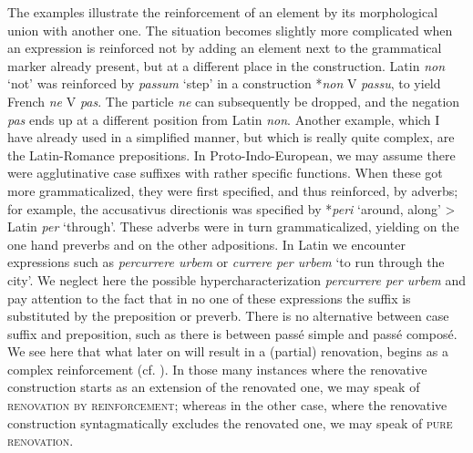 The examples illustrate the reinforcement of an element by its morphological union with another one. The situation becomes slightly more complicated when an expression is reinforced not by adding an element next to the grammatical marker already present, but at a different place in the construction. Latin \textit{non} ‘not’ was reinforced by \textit{passum} ‘step’ in a construction *\textit{non} V \textit{passu}, to yield French \textit{ne} V \textit{pas}. The particle \textit{ne} can subsequently be dropped, and the negation \textit{pas} ends up at a different position from Latin \textit{non}. Another example, which I have already used in a simplified manner, but which is really quite complex, are the Latin-Romance prepositions. In Proto-Indo-European, we may assume there were agglutinative case suffixes with rather specific functions. When these got more grammaticalized, they were first specified, and thus reinforced, by adverbs; for example, the accusativus directionis was specified by *\textit{peri} ‘around, along’ {\textgreater} Latin \textit{per} ‘through’. These adverbs were in turn grammaticalized, yielding on the one hand preverbs and on the other adpositions. In Latin we encounter expressions such as \textit{percurrere urbem} or \textit{currere per urbem} ‘to run through the city’. We neglect here the possible hypercharacterization \textit{percurrere per urbem} and pay attention to the fact that in no one of these expressions the suffix is substituted by the preposition or preverb. There is no alternative between case suffix and preposition, such as there is between passé simple and passé composé. We see here that what later on will result in a (partial) renovation, begins as a complex reinforcement (cf. \citealt[55]{Jakobson1936}). In those many instances where the renovative construction starts as an extension of the renovated one, we may speak of \textsc{renovation by reinforcement}; whereas in the other case, where the renovative construction syntagmatically excludes the renovated one, we may speak of \textsc{pure renovation}.

